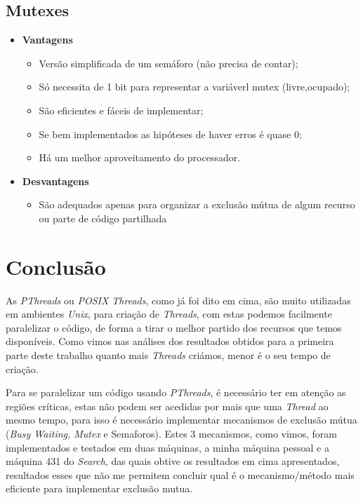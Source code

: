 \documentclass[conference,compsoc]{IEEEtran}
\begin{document}
\subsection{Mutexes}
\begin{itemize}
\item \textbf{Vantagens}
\begin{itemize}
\item Versão simplificada de um semáforo (não precisa de contar);
\item Só necessita de 1 bit para representar a variáverl mutex (livre,ocupado);
\item São eficientes e fáceis de implementar;
\item Se bem implementados as hipóteses de haver erros é quase 0;
\item Há um melhor aproveitamento do processador.
\end{itemize}
\item \textbf{Desvantagens}
\begin{itemize}
\item São adequados apenas para organizar a exclusão mútua de algum recurso ou parte de código partilhada
\end{itemize}
\end{itemize}

\section{Conclusão}
As \textit{PThreads} ou \textit{POSIX Threads}, como já foi dito em cima, são muito utilizadas em ambientes \textit{Unix}, para criação de \textit{Threads}, com estas podemos facilmente paralelizar o código, de forma a tirar o melhor partido dos recursos que temos disponíveis. Como vimos nas análises dos resultados obtidos para a primeira parte deste trabalho quanto mais \textit{Threads} criámos, menor é o seu tempo de criação.

Para se paralelizar um código usando \textit{PThreads}, é necessário ter em atenção as regiões críticas, estas não podem ser acedidas por mais que uma \textit{Thread} ao mesmo tempo, para isso é necessário implementar mecanismos de exclusão mútua (\textit{Busy Waiting, Mutex} e Semaforos). Estes 3 mecanismos, como vimos, foram implementados e testados em duas máquinas, a minha máquina pessoal e a máquina 431 do \textit{Search}, das quais obtive os resultados em cima apresentados, resultados esses que não me permitem concluir qual é o mecanismo/método mais eficiente para implementar exclusão mutua. 
\end{document}
